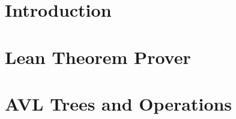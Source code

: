 \documentclass[11pt,oneside, a4paper, titlepage]{article}
\theoremstyle{definition}
\theoremstyle{definition}
\begin{document}





\tableofcontents

\newpage

\section{Introduction}


\section{Lean Theorem Prover}


\section{AVL Trees and Operations}

\end{document}
